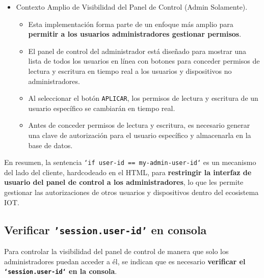 \documentclass{report}
\begin{document}
\begin{itemize}
    \item Contexto Amplio de Visibilidad del Panel de Control (Admin Solamente).
    \begin{itemize}
        \item Esta implementación forma parte de un enfoque más amplio para \textbf{permitir a los usuarios administradores gestionar permisos}.
        \item El panel de control del administrador está diseñado para mostrar una lista de todos los usuarios en línea con botones para conceder permisos 
              de lectura y escritura en tiempo real a los usuarios y dispositivos no administradores.
        \item Al seleccionar el botón \texttt{APLICAR}, los permisos de lectura y escritura de un usuario específico se cambiarán en tiempo real.
        \item Antes de conceder permisos de lectura y escritura, es necesario generar una clave de autorización para el usuario específico y 
              almacenarla en la base de datos.
    \end{itemize}
\end{itemize}

En resumen, la sentencia \texttt{`if user-id == my-admin-user-id`} es un mecanismo del lado del cliente, hardcodeado en el HTML, para 
\textbf{restringir la interfaz de usuario del panel de control a los administradores}, lo que les permite gestionar las autorizaciones de otros usuarios 
y dispositivos dentro del ecosistema IOT.

\subsection{Verificar \texttt{'session.user-id'} en consola}
Para controlar la visibilidad del panel de control de manera que solo los administradores puedan acceder a él, se  indican que es necesario
\textbf{verificar el \texttt{`session.user-id`} en la consola}.
\end{document}

